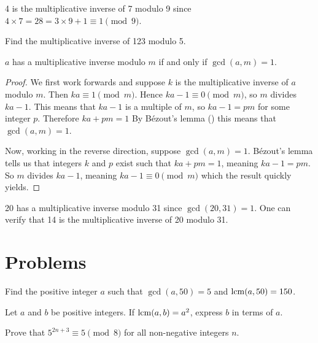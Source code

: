 \begin{example}
    4 is the multiplicative inverse of 7 modulo 9 since $4 \times 7 = 28 = 3 \times 9 + 1 \equiv 1 \pmod 9$.
\end{example}

\begin{exercise}
    Find the multiplicative inverse of 123 modulo 5.
\end{exercise}

\begin{proposition}\label{prop-multiplicative-inverse-exists-iff-coprime}
    $a$ has a multiplicative inverse modulo $m$ if and only if $\gcd(a,m) = 1$.
\end{proposition}
\begin{proof}
    We first work forwards and suppose $k$ is the multiplicative inverse of $a$ modulo $m$. Then $ka \equiv 1 \pmod m$. Hence $ka - 1 \equiv 0 \pmod m$, so $m$ divides $ka - 1$. This means that $ka - 1$ is a multiple of $m$, so $ka - 1 = pm$ for some integer $p$. Therefore $ka + pm = 1$ By B\'{e}zout's lemma () this means that $\gcd(a, m) = 1$.

    Now, working in the reverse direction, suppose $\gcd(a, m) = 1$. B\'{e}zout's lemma tells us that integers $k$ and $p$ exist such that $ka + pm = 1$, meaning $ka - 1 = pm$. So $m$ divides $ka - 1$, meaning $ka - 1 \equiv 0 \pmod m$ which the result quickly yields.
\end{proof}

\begin{example}
    20 has a multiplicative inverse modulo 31 since $\gcd(20, 31) = 1$. One can verify that 14 is the multiplicative inverse of 20 modulo 31.
\end{example}



\section{Problems}
\begin{problem}
    Find the positive integer $a$ such that $\gcd(a, 50) = 5$ and $\mathrm{lcm}(a, 50) = 150$.
\end{problem}

\begin{problem}
    Let $a$ and $b$ be positive integers. If $\mathrm{lcm}(a, b) = a^2$, express $b$ in terms of $a$.
\end{problem}

\begin{problem}
    Prove that $5^{2n+3} \equiv 5 \pmod 8$ for all non-negative integers $n$.
\end{problem}

